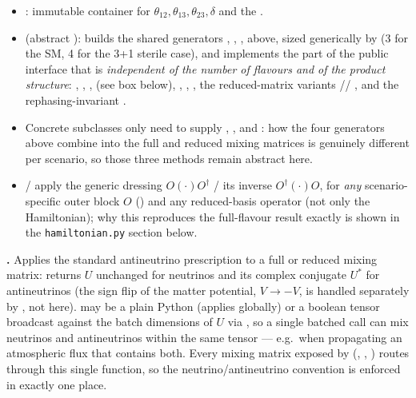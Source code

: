 \begin{implbox}
\begin{itemize}
  \item {}: immutable container for
    $\theta_{12},\theta_{13},\theta_{23},\delta$ and the
    .
  \item {} (abstract ): builds the
    shared generators , , ,
     above, sized generically by  (3
    for the SM, 4 for the 3+1 sterile case), and implements the part of the
    public interface that is \emph{independent of the number of flavours
    and of the product structure}: , ,
    ,  (see box below),
    , , , the
    reduced-matrix variants
    //%
    , and the rephasing-invariant
    .
  \item Concrete subclasses only need to supply ,
    , and : how the four generators
    above combine into the full and reduced mixing matrices is genuinely
    different per scenario, so those three methods remain abstract here.
  \item {} /  apply the generic
    dressing $O(\cdot)O^\dagger$ / its inverse $O^\dagger(\cdot)O$, for
    \emph{any} scenario-specific outer block $O$ () and
    any reduced-basis operator (not only the Hamiltonian); why this
    reproduces the full-flavour result exactly is shown in the
    \texttt{hamiltonian.py} section below.
\end{itemize}
\end{implbox}

\begin{implbox}
\textbf{.} Applies the standard
antineutrino prescription to a full or reduced mixing matrix: returns $U$
unchanged for neutrinos and its complex conjugate $U^*$ for antineutrinos
(the sign flip of the matter potential, $V\to-V$, is handled separately by
, not here).  may be a
plain Python  (applies globally) or a boolean tensor broadcast
against the batch dimensions of $U$ via , so a single
batched call can mix neutrinos and antineutrinos within the same tensor ---
e.g.\ when propagating an atmospheric flux that contains both. Every mixing
matrix exposed by  (, ,
) routes through this single function, so the
neutrino/antineutrino convention is enforced in exactly one place.
\end{implbox}

